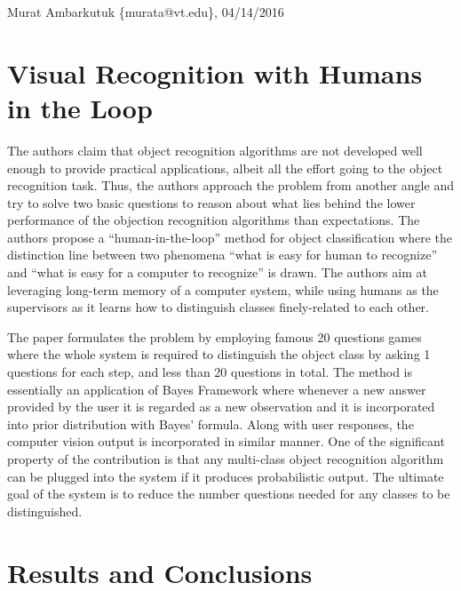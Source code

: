 \documentclass[11pt]{article}
\begin{document}
\thispagestyle{empty}
\begin{flushright}
	\small{Murat Ambarkutuk \{murata@vt.edu\}, 04/14/2016}
\end{flushright}
\section*{Visual Recognition with Humans in the Loop}
The authors claim that object recognition algorithms are not developed well enough to provide practical applications, albeit all the effort going to the object recognition task.
Thus, the authors approach the problem from another angle and try to solve two basic questions to reason about what lies behind the lower performance of the objection recognition algorithms than expectations.
The authors propose a ``human-in-the-loop'' method for object classification where the distinction line between two phenomena ``what is easy for human to recognize'' and ``what is easy for a computer to recognize'' is drawn.
The authors aim at leveraging long-term memory of a computer system, while using humans as the supervisors as it learns how to distinguish classes finely-related to each other.

The paper formulates the problem by employing famous 20 questions games where the whole system is required to distinguish the object class by asking 1 questions for each step, and less than 20 questions in total.
The method is essentially an application of Bayes Framework where whenever a new answer provided by the user it is regarded as a new observation and it is incorporated into prior distribution with Bayes' formula.
Along with user responses, the computer vision output is incorporated in similar manner.
One of the significant property of the contribution is that any multi-class object recognition algorithm can be plugged into the system if it produces probabilistic output.
The ultimate goal of the system is to reduce the number questions needed for any classes to be distinguished.

\section*{Results and Conclusions}

% 
% 
\end{document}
